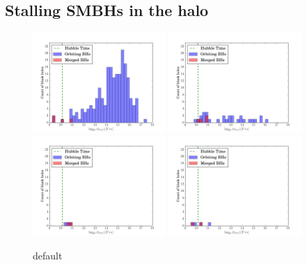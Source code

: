 \documentclass[english, apj]{emulateapj}
\begin{document}
\subsection{Stalling SMBHs in the halo}
\begin{figure}[htbp]
\begin{center}
\includegraphics[width=0.45\textwidth]{plots/t_at_center_histogram_gal_1.png}
\includegraphics[width=0.45\textwidth]{plots/t_at_center_histogram_gal_65.png}\\
\includegraphics[width=0.45\textwidth]{plots/t_at_center_histogram_gal_187.png}
\includegraphics[width=0.45\textwidth]{plots/t_at_center_histogram_gal_217.png}\\
\caption{default}
\label{default5}
\end{center}
\end{figure}
\end{document}
